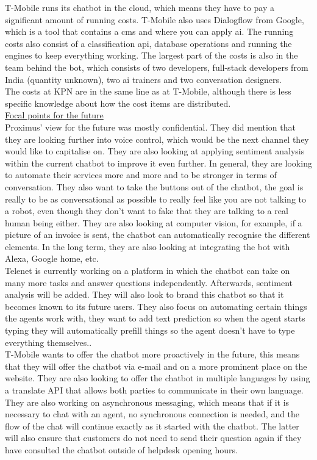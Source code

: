 \break
T-Mobile runs its chatbot in the cloud, which means they have to pay a significant amount of running costs. T-Mobile also uses Dialogflow from Google, which is a tool that contains a \acrshort{cms} and where you can apply \acrshort{ai}. The running costs also consist of a classification \acrshort{api}, database operations and running the engines to keep everything working. The largest part of the costs is also in the team behind the bot, which consists of two developers, full-stack developers from India (quantity unknown), two \acrshort{ai} trainers and two conversation designers.\\
\break
The costs at KPN are in the same line as at T-Mobile, although there is less specific knowledge about how the cost items are distributed.\\
\break
{}
\ul{Focal points for the future}\\
Proximus' view for the future was mostly confidential. They did mention that they are looking further into voice control, which would be the next channel they would like to capitalise on. They are also looking at applying sentiment analysis within the current chatbot to improve it even further. In general, they are looking to automate their services more and more and to be stronger in terms of conversation. They also want to take the buttons out of the chatbot, the goal is really to be as conversational as possible to really feel like you are not talking to a robot, even though they don't want to fake that they are talking to a real human being either. They are also looking at computer vision, for example, if a picture of an invoice is sent, the chatbot can automatically recognise the different elements. In the long term, they are also looking at integrating the bot with Alexa, Google home, etc.\\
\break
Telenet is currently working on a platform in which the chatbot can take on many more tasks and answer questions independently. Afterwards, sentiment analysis will be added. They will also look to brand this chatbot so that it becomes known to its future users. They also focus on automating certain things the agents work with, they want to add text prediction so when the agent starts typing they will automatically prefill things so the agent doesn't have to type everything themselves..\\
\break
T-Mobile wants to offer the chatbot more proactively in the future, this means that they will offer the chatbot via e-mail and on a more prominent place on the website. They are also looking to offer the chatbot in multiple languages by using a translate API that allows both parties to communicate in their own language. They are also working on asynchronous messaging, which means that if it is necessary to chat with an agent, no synchronous connection is needed, and the flow of the chat will continue exactly as it started with the chatbot. The latter will also ensure that customers do not need to send their question again if they have consulted the chatbot outside of helpdesk opening hours.\\
